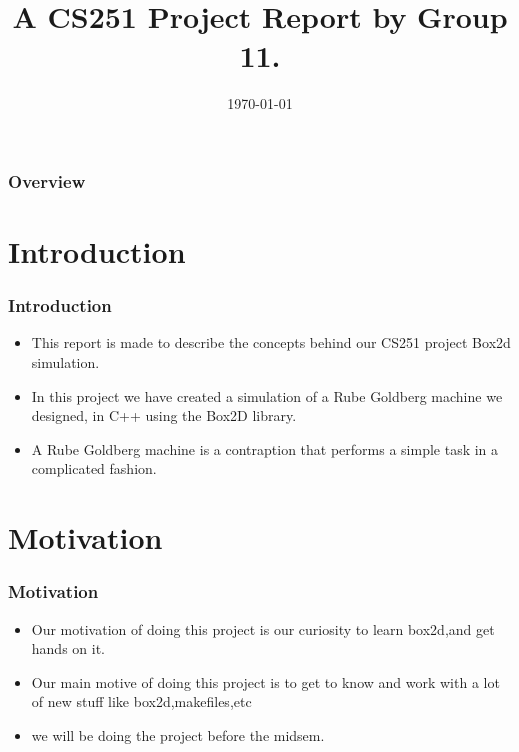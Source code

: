 \documentclass{beamer}
\title[Short title]{A CS251 Project Report
by Group 11.} %
\author[N Divakar Reddy \& Y Pushyarag  \& Vishal Babu Bhavani]
{%
  \texorpdfstring{
    \begin{columns}%
      \column{.30\linewidth}
      \centering
      N Divakar Reddy\\
      140050044\\
      divakar@cse.iitb.ac.in
      \column{.30\linewidth}
      \centering
      Y Pushyarag\\ 
      140050047\\
      pushyarag@cse.iitb.ac.in
      \column{.30\linewidth}
      \centering
      Vishal Babu Bhavani\\
      140050049\\
      johnpete@cse.iitb.ac.in
    \end{columns}
  }
  {N Divakar Reddy \& Y Pushyarag  \& Vishal Babu Bhavani}
}
\date{\today} %
\begin{document}
\begin{frame}
\titlepage %
\end{frame}

\begin{frame}
\frametitle{Overview} %
\tableofcontents %
\end{frame}

\section{Introduction}
\begin{frame}
\frametitle{Introduction}
\begin{itemize}
\item This report is made to describe the concepts behind our CS251
project Box2d simulation.
\item  In this project we have created a simulation of a Rube Goldberg machine we designed, in C++ using the Box2D library.
\item  A Rube Goldberg machine is a contraption that performs a simple task in a complicated fashion.
\end{itemize}
\end{frame}



\section{Motivation}
\begin{frame}
\frametitle{Motivation}
\begin{itemize}
\item Our motivation of doing this project is our curiosity to learn box2d,and get hands on it.
\item Our main motive of doing this project is to get to know and work with a lot of new stuff like
box2d,makefiles,etc
\item we will be doing the project before the midsem.
\end{itemize}
\end{frame}
\end{document}
